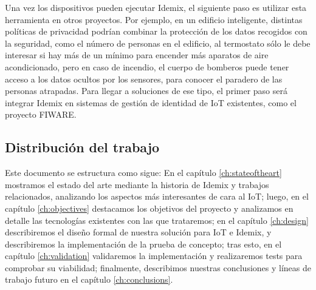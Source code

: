Una vez los dispositivos pueden ejecutar Idemix, el siguiente paso es utilizar esta herramienta en otros proyectos. Por ejemplo, en un edificio inteligente, distintas políticas de privacidad podrían combinar la protección de los datos recogidos con la seguridad, como el número de personas en el edificio, al termostato sólo le debe interesar si hay más de un mínimo para encender más aparatos de aire acondicionado, pero en caso de incendio, el cuerpo de bomberos puede tener acceso a los datos ocultos por los sensores, para conocer el paradero de las personas atrapadas. Para llegar a soluciones de ese tipo, el primer paso será integrar Idemix en sistemas de gestión de identidad de IoT existentes, como el proyecto FIWARE.

\hfil


\subsection*{Distribución del trabajo}


Este documento se estructura como sigue: En el capítulo \ref{ch:stateoftheart} mostramos el estado del arte mediante la historia de Idemix y trabajos relacionados, analizando los aspectos más interesantes de cara al IoT; luego, en el capítulo \ref{ch:objectives} destacamos los objetivos del proyecto y analizamos en detalle las tecnologías existentes con las que trataremos; en el capítulo \ref{ch:design} describiremos el diseño formal de nuestra solución para IoT e Idemix, y describiremos la implementación de la prueba de concepto; tras esto, en el capítulo \ref{ch:validation} validaremos la implementación y realizaremos tests para comprobar su viabilidad; finalmente, describimos nuestras conclusiones y líneas de trabajo futuro en el capítulo \ref{ch:conclusions}.
